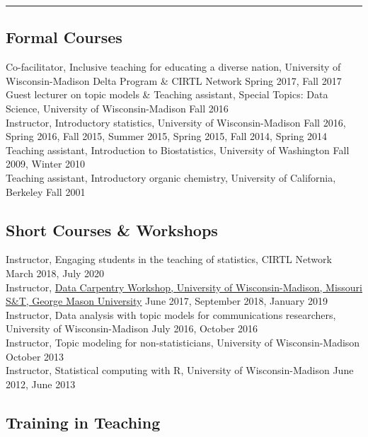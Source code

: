 \documentclass[
  10pt,
]
{article}
\begin{document}
\hrule

\subsection{Formal Courses}\label{formal-courses}

\normalsize Co-facilitator, Inclusive teaching for educating a diverse
nation, University of Wisconsin-Madison Delta Program \& CIRTL Network
\hfill Spring 2017, Fall 2017\\
\normalsize Guest lecturer on topic models \& Teaching assistant,
Special Topics: Data Science, University of Wisconsin-Madison
\hfill Fall 2016\\
\normalsize Instructor, Introductory statistics, University of
Wisconsin-Madison \hfill Fall 2016, Spring 2016, Fall 2015, Summer 2015,
Spring 2015, Fall 2014, Spring 2014\\
\normalsize Teaching assistant, Introduction to Biostatistics,
University of Washington \hfill Fall 2009, Winter 2010\\
\normalsize Teaching assistant, Introductory organic chemistry,
University of California, Berkeley \hfill Fall 2001

\subsection{Short Courses \& Workshops}\label{short-courses-workshops}

\normalsize Instructor, Engaging students in the teaching of statistics,
CIRTL Network \hfill March 2018, July 2020\\
\normalsize Instructor,
\href{https://uw-madison-aci.github.io/2017-06-19-uwmadison-dc/}{Data
Carpentry Workshop, University of Wisconsin-Madison, Missouri S\&T,
George Mason University} \hfill June 2017, September 2018, January
2019\\
\normalsize Instructor, Data analysis with topic models for
communications researchers, University of Wisconsin-Madison \hfill July
2016, October 2016\\
\normalsize Instructor, Topic modeling for non-statisticians, University
of Wisconsin-Madison \hfill October 2013\\
\normalsize Instructor, Statistical computing with R, University of
Wisconsin-Madison \hfill June 2012, June 2013

\subsection{Training in Teaching}\label{training-in-teaching}
\end{document}
